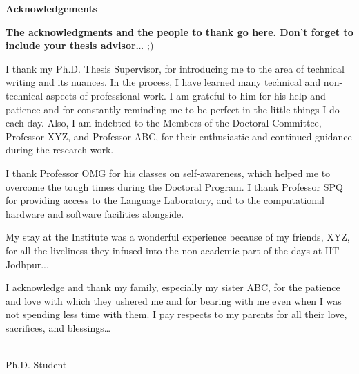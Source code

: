 \setmainfont[ Path = font/,
 BoldFont={CandaraBI}, 
 ItalicFont={booki},
 BoldItalicFont={bookbi}
 ]{bookr}

\begin{flushright}
\huge{\textbf{Acknowledgements}}
\end{flushright}


 \textbf{The acknowledgments and the people to thank go here. Don't forget to include your thesis advisor\ldots} ;)

 
 I thank my Ph.D. Thesis Supervisor, \textit{\supname} for introducing me to the area of technical writing and its nuances. In the process, I have learned many technical and non-technical aspects of professional work. I am grateful to him for his help and patience and for constantly reminding me to be perfect in the little things I do each day. Also, I am indebted to the Members of the Doctoral Committee, Professor XYZ, and Professor ABC, for their enthusiastic and continued guidance during the research work.

I thank Professor OMG for his classes on self-awareness, which helped me to overcome the tough times during the Doctoral Program. I thank Professor SPQ for providing access to the Language Laboratory, and to the computational hardware and software facilities alongside.

My stay at the Institute was a wonderful experience because of my friends, XYZ, for all the liveliness they infused into the non-academic part of the days at IIT Jodhpur... 

I acknowledge and thank my family, especially my sister ABC, for the patience and love with which they ushered me and for bearing with me even when I was not spending less time with them. I pay respects to my parents for all their love, sacrifices, and blessings… 

\begin{flushright}
\authorname  \\
Ph.D. Student
 
\end{flushright}



 
 
 



